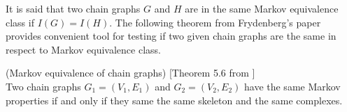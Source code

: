 It is said that two chain graphs $G$ and $H$ are in the same Markov equivalence class if $I(G) = I(H)$. 
The following theorem from Frydenberg's paper \cite{CGMP} provides convenient tool for testing if two given 
chain graphs are the same in respect to Markov equivalence class.

\begin{prop} \label{markovEquivThm} (Markov equivalence of chain graphs) [Theorem 5.6 from \cite{CGMP}] \\
	Two chain graphs $G_1 = (V_1, E_1)$ and $G_2 = (V_2, E_2)$ have the same Markov properties if and only if they same 
	the same skeleton and the same complexes.
\end{prop}	



